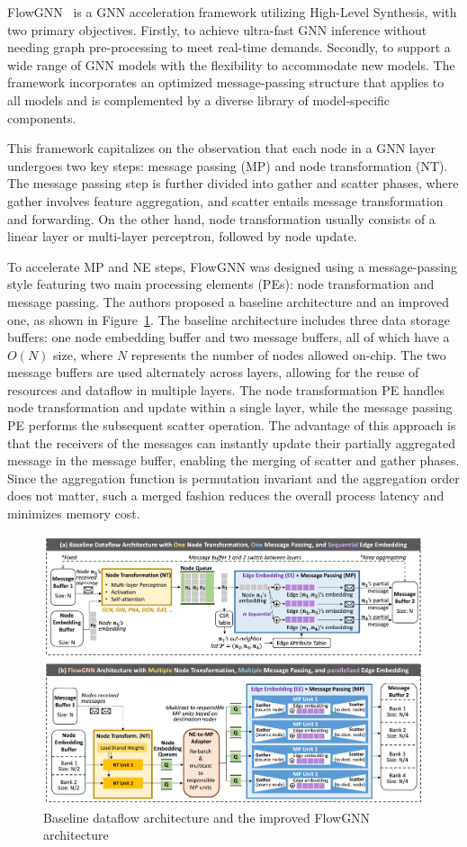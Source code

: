 FlowGNN~\cite{sarkar2022flowgnn} is a GNN acceleration framework utilizing High-Level Synthesis, with two primary objectives.
Firstly, to achieve ultra-fast GNN inference without needing graph pre-processing to meet real-time demands.
Secondly, to support a wide range of GNN models with the flexibility to accommodate new models.
The framework incorporates an optimized message-passing structure that applies to all models and is complemented by a diverse library of model-specific components.

This framework capitalizes on the observation that each node in a GNN layer undergoes two key steps: message passing (MP) and node transformation (NT). The message passing step is further divided into gather and scatter phases, where gather involves feature aggregation, and scatter entails message transformation and forwarding.
On the other hand, node transformation usually consists of a linear layer or multi-layer perceptron, followed by node update.

To accelerate MP and NE steps, FlowGNN was designed using a message-passing style featuring two main processing elements (PEs): node transformation and message passing.
The authors proposed a baseline architecture and an improved one, as shown in Figure~\ref{fig:FlowGNN_architecture}.
The baseline architecture includes three data storage buffers: one node embedding buffer and two message buffers, all of which have a $O(N)$ size, where $N$ represents the number of nodes allowed on-chip.
The two message buffers are used alternately across layers, allowing for the reuse of resources and dataflow in multiple layers.
The node transformation PE handles node transformation and update within a single layer, while the message passing PE performs the subsequent scatter operation.
The advantage of this approach is that the receivers of the messages can instantly update their partially aggregated message in the message buffer, enabling the merging of scatter and gather phases.
Since the aggregation function is permutation invariant and the aggregation order does not matter, such a merged fashion reduces the overall process latency and minimizes memory cost.

\begin{figure}[t]
    \centering
    \includegraphics[height=0.56\textwidth]{Images/FlowGNN_architecture}
    \caption{Baseline dataflow architecture and the improved FlowGNN architecture~\cite{sarkar2022flowgnn}}
    \label{fig:FlowGNN_architecture}
\end{figure}

